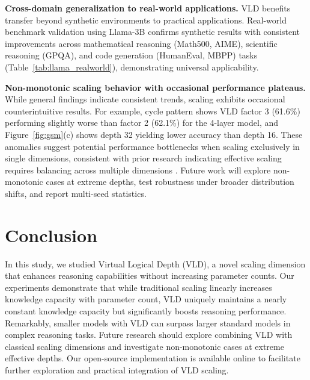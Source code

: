 \documentclass{article} %
\begin{document}
\textbf{Cross-domain generalization to real-world applications.} 
VLD benefits transfer beyond synthetic environments to practical applications. Real-world benchmark validation using Llama-3B confirms synthetic results with consistent improvements across mathematical reasoning (Math500, AIME), scientific reasoning (GPQA), and code generation (HumanEval, MBPP) tasks (Table~\ref{tab:llama_realworld}), demonstrating universal applicability.

\textbf{Non-monotonic scaling behavior with occasional performance plateaus.} 
While general findings indicate consistent trends, scaling exhibits occasional counterintuitive results. For example, cycle pattern shows VLD factor 3 (61.6\%) performing slightly worse than factor 2 (62.1\%) for the 4-layer model, and Figure~\ref{fig:gsm}(c) shows depth 32 yielding lower accuracy than depth 16. These anomalies suggest potential performance bottlenecks when scaling exclusively in single dimensions, consistent with prior research indicating effective scaling requires balancing across multiple dimensions \citep{Wei2022Emergent}. Future work will explore non-monotonic cases at extreme depths, test robustness under broader distribution shifts, and report multi-seed statistics.



\section{Conclusion}

In this study, we studied Virtual Logical Depth (VLD), a novel scaling dimension that enhances reasoning capabilities without increasing parameter counts. Our experiments demonstrate that while traditional scaling linearly increases knowledge capacity with parameter count, VLD uniquely maintains a nearly constant knowledge capacity but significantly boosts reasoning performance. Remarkably, smaller models with VLD can surpass larger standard models in complex reasoning tasks. Future research should explore combining VLD with classical scaling dimensions and investigate non-monotonic cases at extreme effective depths. Our open-source implementation is available online to facilitate further exploration and practical integration of VLD scaling.

\end{document}
